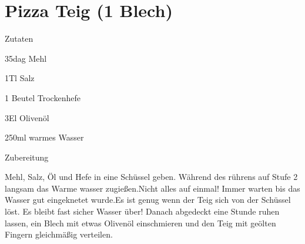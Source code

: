 \chapter*{Pizza Teig (1 Blech)}
\begin{multicols}{2}
 {\Large Zutaten}
 \begin{Zutaten}
		\item 35dag Mehl
		\item 1Tl Salz
		\item 1 Beutel Trockenhefe
		\item 3El Olivenöl
		\item 250ml warmes Wasser
		
		
		
\end{Zutaten}
\columnbreak
{}
\end{multicols}

{\Large Zubereitung} \newline
\begin{addmargin}[1cm]{0cm}
	Mehl, Salz, Öl und Hefe in eine Schüssel geben. Während des rührens auf Stufe 2 langsam das Warme
	wasser zugießen.\newline Nicht alles auf einmal! Immer warten bis das Wasser gut eingeknetet wurde.\newline Es ist
	genug wenn der Teig sich von der Schüssel löst. Es bleibt fast sicher Wasser über!\newline
	Danach abgedeckt eine Stunde ruhen lassen, ein Blech mit etwas Olivenöl einschmieren und den Teig mit geölten Fingern gleichmäßig
	verteilen.
	
	

\end{addmargin}
